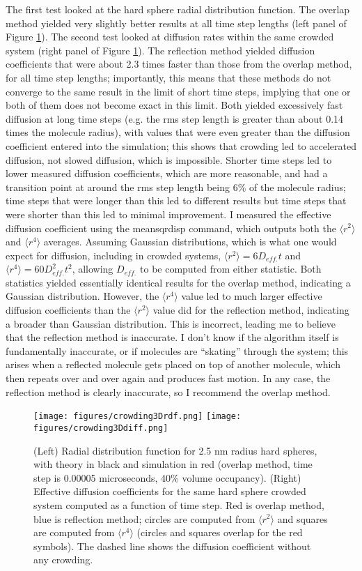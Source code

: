 \documentclass {scrbook}
\begin{document}
The first test looked at the hard sphere radial distribution function. The overlap method yielded very slightly better results at all time step lengths (left panel of Figure \ref{fig:crowding3D}). The second test looked at diffusion rates within the same crowded system (right panel of Figure \ref{fig:crowding3D}). The reflection method yielded diffusion coefficients that were about 2.3 times faster than those from the overlap method, for all time step lengths; importantly, this means that these methods do not converge to the same result in the limit of short time steps, implying that one or both of them does not become exact in this limit. Both yielded excessively fast diffusion at long time steps (e.g. the rms step length is greater than about 0.14 times the molecule radius), with values that were even greater than the diffusion coefficient entered into the simulation; this shows that crowding led to accelerated diffusion, not slowed diffusion, which is impossible. Shorter time steps led to lower measured diffusion coefficients, which are more reasonable, and had a transition point at around the rms step length being 6\% of the molecule radius; time steps that were longer than this led to different results but time steps that were shorter than this led to minimal improvement. I measured the effective diffusion coefficient using the meansqrdisp command, which outputs both the $\langle r^2 \rangle$ and $\langle r^4 \rangle$ averages. Assuming Gaussian distributions, which is what one would expect for diffusion, including in crowded systems, $\langle r^2 \rangle = 6 D_{eff.} t$ and $\langle r^4 \rangle = 60 D_{eff.}^2 t^2$, allowing $D_{eff.}$ to be computed from either statistic. Both statistics yielded essentially identical results for the overlap method, indicating a Gaussian distribution. However, the $\langle r^4 \rangle$ value led to much larger effective diffusion coefficients than the $\langle r^2 \rangle$ value did for the reflection method, indicating a broader than Gaussian distribution. This is incorrect, leading me to believe that the reflection method is inaccurate. I don't know if the algorithm itself is fundamentally inaccurate, or if molecules are ``skating'' through the system; this arises when a reflected molecule gets placed on top of another molecule, which then repeats over and over again and produces fast motion. In any case, the reflection method is clearly inaccurate, so I recommend the overlap method.

\begin{figure}[h]
\centering
\texttt{[image: figures/crowding3Drdf.png]}
\texttt{[image: figures/crowding3Ddiff.png]}
\caption{(Left) Radial distribution function for 2.5 nm radius hard spheres, with theory in black and simulation in red (overlap method, time step is 0.00005 microseconds, 40\% volume occupancy). (Right) Effective diffusion coefficients for the same hard sphere crowded system computed as a function of time step. Red is overlap method, blue is reflection method; circles are computed from $\langle r^2 \rangle$ and squares are computed from $\langle r^4 \rangle$ (circles and squares overlap for the red symbols). The dashed line shows the diffusion coefficient without any crowding.}
\label{fig:crowding3D}
\end{figure}
\end{document}
